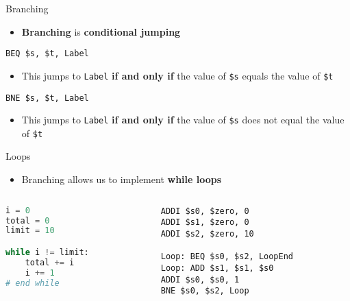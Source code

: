 \begin{frame}[fragile]{Branching}
	\begin{itemize}
		\pause\item \textbf{Branching} is \textbf{conditional jumping}
	\end{itemize}
	\pause\begin{lstlisting}
BEQ $s, $t, Label
	\end{lstlisting}
	\begin{itemize}
		\pause\item This jumps to \lstinline{Label} \textbf{if and only if}
			the value of \lstinline{$s} equals the value of \lstinline{$t}
	\end{itemize}
	\pause\begin{lstlisting}
BNE $s, $t, Label
	\end{lstlisting}
	\begin{itemize}
		\pause\item This jumps to \lstinline{Label} \textbf{if and only if}
			the value of \lstinline{$s} does not equal the value of \lstinline{$t}
	\end{itemize}
\end{frame}

\begin{frame}[fragile]{Loops}
	\begin{itemize}
		\pause\item Branching allows us to implement \textbf{while loops}
	\end{itemize}
	\begin{columns}
		\begin{column}{0.48\textwidth}
			\begin{lstlisting}[language=Python]
i = 0
total = 0
limit = 10

while i != limit:
    total += i
    i += 1
# end while
			\end{lstlisting}
		\end{column}
		\begin{column}{0.48\textwidth}
			\begin{lstlisting}
ADDI $s0, $zero, 0
ADDI $s1, $zero, 0
ADDI $s2, $zero, 10

Loop: BEQ $s0, $s2, LoopEnd
Loop: ADD $s1, $s1, $s0
ADDI $s0, $s0, 1
BNE $s0, $s2, Loop
			\end{lstlisting}
		\end{column}
	\end{columns}
\end{frame}

